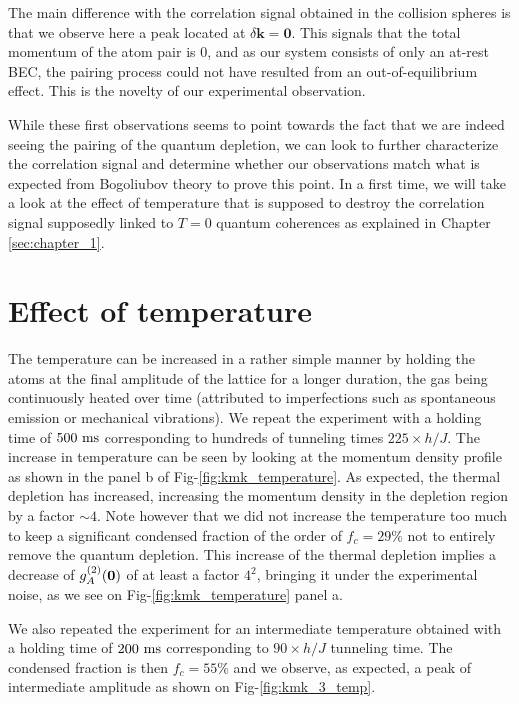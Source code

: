 The main difference with the \kmk correlation signal obtained in the collision spheres is that we observe here a peak located at $\delta \bm{k} = \bm{0}$. This signals that the total momentum of the atom pair is 0, and as our system consists of only an at-rest BEC, the pairing process could not have resulted from an out-of-equilibrium effect. This is the novelty of our experimental observation.

While these first observations seems to point towards the fact that we are indeed seeing the \kmk pairing of the quantum depletion, we can look to further characterize the correlation signal and determine whether our observations match what is expected from Bogoliubov theory to prove this point. In a first time, we will take a look at the effect of temperature that is supposed to destroy the \kmk correlation signal supposedly linked to $T=0$ quantum coherences as explained in Chapter \ref{sec:chapter_1}.

\section{Effect of temperature}

The temperature can be increased in a rather simple manner by holding the atoms at the final amplitude of the lattice for a longer duration, the gas being continuously heated over time (attributed to imperfections such as spontaneous emission or mechanical vibrations). We repeat the experiment with a holding time of $500 \ \rm{ms}$ corresponding to hundreds of tunneling times $225 \times h/J$. The increase in temperature can be seen by looking at the momentum density profile as shown in the panel b of Fig-\ref{fig:kmk_temperature}. As expected, the thermal depletion has increased, increasing the momentum density in the depletion region by a factor $\sim 4$. Note however that we did not increase the temperature too much to keep a significant condensed fraction of the order of $f_c = 29 \%$ not to entirely remove the quantum depletion. This increase of the thermal depletion implies a decrease of $g^{(2)}_A (\bm{0})$ of at least a factor $4^2$, bringing it under the experimental noise, as we see on Fig-\ref{fig:kmk_temperature} panel a.

We also repeated the experiment for an intermediate temperature obtained with a holding time of $200 \ \rm{ms}$ corresponding to $90 \times h/J$ tunneling time. The condensed fraction is then $f_c=55 \%$ and we observe, as expected, a peak of intermediate amplitude as shown on Fig-\ref{fig:kmk_3_temp}.

